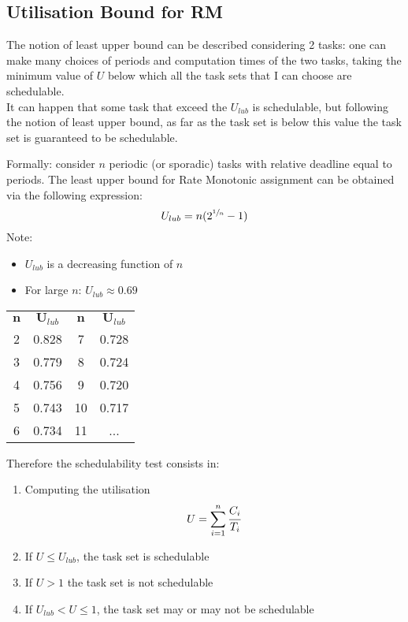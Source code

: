 \subsection{Utilisation Bound for RM}
The notion of least upper bound can be described considering 2 tasks: one can make many choices of periods and computation times of the two tasks, taking the minimum value of $U$ below which all the task sets that I can choose are schedulable.\\
It can happen that some task that exceed the $U_{lub}$ is schedulable, but following the notion of least upper bound, as far as the task set is below this value the task set is guaranteed to be schedulable.

Formally: consider $n$ periodic (or sporadic) tasks with relative deadline equal to periods. The least upper bound for Rate Monotonic assignment can be obtained via the following expression:
\[U_{lub} = n(2^{\sfrac{1}{n}} - 1)\]
Note:
\begin{itemize}
\item $U_{lub}$ is a decreasing function of $n$
\item For large $n$: $U_{lub}\approx 0.69$
\end{itemize}

\begin{table}[!h]
\centering
\begin{NiceTabular}[hvlines]{c|c||c|c}
$\mathbf{n}$&$\mathbf{U}_{lub}$&$\mathbf{n}$&$\mathbf{U}_{lub}$\\
2 & 0.828 & 7&0.728\\
3 & 0.779 & 8 & 0.724\\
4 & 0.756 & 9 &0.720\\
5 & 0.743 & 10 & 0.717\\
6 & 0.734 & 11 & ...\\
\end{NiceTabular}
\end{table}

Therefore the schedulability test consists in:
\begin{enumerate}
\item Computing the utilisation
\[U = \sum_{i=1}^{n} \cfrac{C_i}{T_i}\]
\item If $U \le U_{lub}$, the task set is schedulable
\item If $U > 1$ the task set is not schedulable
\item If $U_{lub} < U \le 1$, the task set may or may not be schedulable
\end{enumerate}

